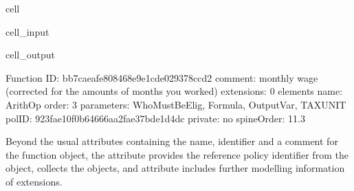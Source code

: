 \documentclass[letterpaper,10pt,english]{sphinxmanual}
\begin{document}
\begin{sphinxuseclass}{cell}
\begin{sphinxuseclass}{cell_input}
\begin{sphinxVerbatim}[commandchars=\\\{\}]
\PYG{p}{[}\PYG{p}{]}\PYG{p}{[}\PYG{p}{]}\PYG{p}{[}\PYG{p}{]}
\end{sphinxVerbatim}

\end{sphinxuseclass}
\begin{sphinxuseclass}{cell_output}
\begin{sphinxVerbatim}[commandchars=\\\{\}]
\PYGZhy{}\PYGZhy{}\PYGZhy{}\PYGZhy{}\PYGZhy{}\PYGZhy{}\PYGZhy{}\PYGZhy{}\PYGZhy{}\PYGZhy{}\PYGZhy{}\PYGZhy{}\PYGZhy{}\PYGZhy{}\PYGZhy{}\PYGZhy{}\PYGZhy{}\PYGZhy{}\PYGZhy{}\PYGZhy{}\PYGZhy{}\PYGZhy{}\PYGZhy{}\PYGZhy{}\PYGZhy{}\PYGZhy{}\PYGZhy{}\PYGZhy{}\PYGZhy{}\PYGZhy{}
Function
\PYGZhy{}\PYGZhy{}\PYGZhy{}\PYGZhy{}\PYGZhy{}\PYGZhy{}\PYGZhy{}\PYGZhy{}\PYGZhy{}\PYGZhy{}\PYGZhy{}\PYGZhy{}\PYGZhy{}\PYGZhy{}\PYGZhy{}\PYGZhy{}\PYGZhy{}\PYGZhy{}\PYGZhy{}\PYGZhy{}\PYGZhy{}\PYGZhy{}\PYGZhy{}\PYGZhy{}\PYGZhy{}\PYGZhy{}\PYGZhy{}\PYGZhy{}\PYGZhy{}\PYGZhy{}
	 ID: \PYGZsq{}bb7caeaf\PYGZhy{}e808\PYGZhy{}468e\PYGZhy{}9e1c\PYGZhy{}de029378ccd2\PYGZsq{}
	 comment: \PYGZsq{}monthly wage (corrected for the amounts of months you worked)\PYGZsq{}
	 extensions: 0 elements
	 name: \PYGZsq{}ArithOp\PYGZsq{}
	 order: \PYGZsq{}3\PYGZsq{}
	 parameters: Who\PYGZus{}Must\PYGZus{}Be\PYGZus{}Elig, Formula, Output\PYGZus{}Var, TAX\PYGZus{}UNIT
	 polID: \PYGZsq{}923fae10\PYGZhy{}f0b6\PYGZhy{}4666\PYGZhy{}aa2f\PYGZhy{}ae37bde1d4dc\PYGZsq{}
	 private: \PYGZsq{}no\PYGZsq{}
	 spineOrder: \PYGZsq{}11.3\PYGZsq{}
\end{sphinxVerbatim}

\end{sphinxuseclass}
\end{sphinxuseclass}
\sphinxAtStartPar
Beyond the usual attributes containing the name, identifier and a comment for the function object, the attribute  provides the reference policy identifier from the  object,  collects the  objects, and  attribute includes further modelling information of extensions.
\end{document}
